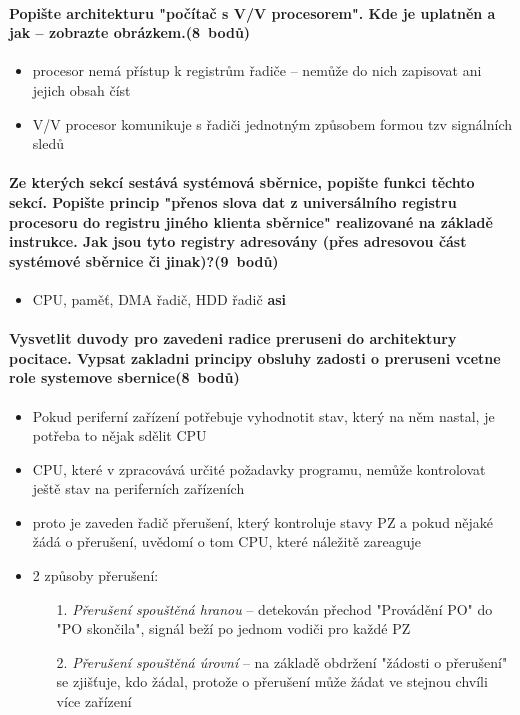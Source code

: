 \documentclass[a5paper,10pt]{article}
\begin{document}
\paragraph{Popište architekturu "počítač s V/V procesorem". Kde je uplatněn a jak -- zobrazte obrázkem.\hfill(8~bodů)}
\begin{itemize}
	\item procesor nemá přístup k registrům řadiče -- nemůže do nich zapisovat ani jejich obsah číst
	\item V/V procesor komunikuje s řadiči jednotným způsobem formou tzv signálních sledů
\end{itemize}

\paragraph{Ze kterých sekcí sestává systémová sběrnice, popište funkci těchto sekcí. Popište princip "přenos slova dat z universálního registru procesoru do registru jiného klienta sběrnice" realizované na základě instrukce. Jak jsou tyto registry adresovány (přes adresovou část systémové sběrnice či jinak)?\hfill(9~bodů)}
\begin{itemize}
	\item CPU, paměť, DMA řadič, HDD řadič \hfill \textbf{asi} 
\end{itemize}


\paragraph{Vysvetlit duvody pro zavedeni radice preruseni do architektury pocitace. Vypsat zakladni principy obsluhy zadosti o preruseni vcetne role systemove sbernice\hfill(8~bodů)}
\begin{itemize}
	\item Pokud periferní zařízení potřebuje vyhodnotit stav, který na něm nastal, je potřeba to nějak sdělit CPU
	\item CPU, které v zpracovává určité požadavky programu, nemůže kontrolovat ještě stav na periferních zařízeních
	\item proto je zaveden řadič přerušení, který kontroluje stavy PZ a pokud nějaké žádá o přerušení, uvědomí o tom CPU, které náležitě zareaguje
	\item 2 způsoby přerušení:
	\begin{itemize}
		\item[1.] \emph{Přerušení spouštěná hranou} -- detekován přechod "Provádění PO" do "PO skončila", signál beží po jednom vodiči pro každé PZ 
		\item[2.] \emph{Přerušení spouštěná úrovní} -- na základě obdržení "žádosti o přerušení" se zjišťuje, kdo žádal, protože o přerušení může žádat ve stejnou chvíli více zařízení
	\end{itemize}	
\end{itemize}
\end{document}
